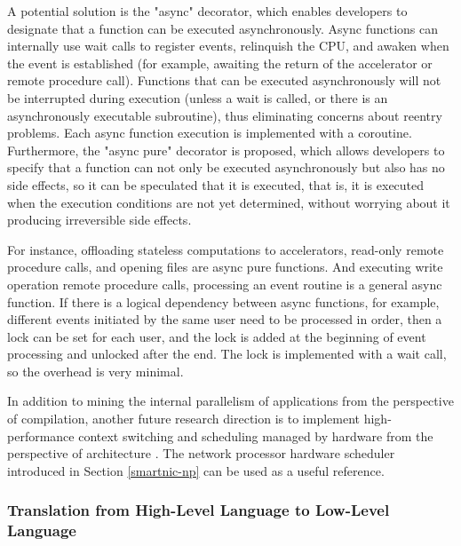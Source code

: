 A potential solution is the "async" decorator, which enables developers to designate that a function can be executed asynchronously. Async functions can internally use wait calls to register events, relinquish the CPU, and awaken when the event is established (for example, awaiting the return of the accelerator or remote procedure call). Functions that can be executed asynchronously will not be interrupted during execution (unless a wait is called, or there is an asynchronously executable subroutine), thus eliminating concerns about reentry problems. Each async function execution is implemented with a coroutine. Furthermore, the "async pure" decorator is proposed, which allows developers to specify that a function can not only be executed asynchronously but also has no side effects, so it can be speculated that it is executed, that is, it is executed when the execution conditions are not yet determined, without worrying about it producing irreversible side effects.

For instance, offloading stateless computations to accelerators, read-only remote procedure calls, and opening files are async pure functions. And executing write operation remote procedure calls, processing an event routine is a general async function. If there is a logical dependency between async functions, for example, different events initiated by the same user need to be processed in order, then a lock can be set for each user, and the lock is added at the beginning of event processing and unlocked after the end. The lock is implemented with a wait call, so the overhead is very minimal.

In addition to mining the internal parallelism of applications from the perspective of compilation, another future research direction is to implement high-performance context switching and scheduling managed by hardware from the perspective of architecture \cite{barroso2017attack}. The network processor hardware scheduler introduced in Section \ref{smartnic-np} can be used as a useful reference.

\iffalse
\subsubsection{Translation from High-Level Language to Low-Level Language}
\label{future:high-to-low}

